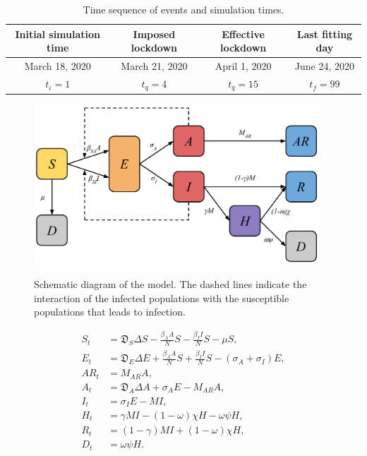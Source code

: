 \documentclass[11pt]{article}
\newcommand{\D}{\mathfrak{D}}
\begin{document}
	\begin{table}[h]
		\centering
		\caption{Time sequence of events and simulation times.}
		\label{tab:times}
		\begin{tabular}{ c c c c }
			\hline
			\hline
			Initial simulation time	&	Imposed lockdown	&	Effective lockdown	&	Last fitting day	\\
			\hline
			March 18, 2020	&	March 21, 2020	&	 April 1, 2020	&	June 24, 2020	\\
			$t_i = 1$	&	$t_q = 4$	&	$t_q = 15$	&	$t_f = 99$ \\
			\hline
			\hline
		\end{tabular}
	\end{table}
	
	\begin{figure}[h!]
		\centering
		\includegraphics[height=6cm]{full-model}
		\label{fig:model}
		\caption{Schematic diagram of the model. The dashed lines indicate the interaction of the infected populations with the susceptible populations that leads to infection.}
	\end{figure}

	\begin{align*}
		S_t &=	\D_S \Delta S - \frac{\beta_{A} A}{N} S - \frac{\beta_{I} I}{N} S - \mu S, \\
		E_t	&=	\D_E \Delta E + \frac{\beta_{A} A}{N} S + \frac{\beta_{I} I}{N} S - (\sigma_A + \sigma_I) E, \\
		AR_t &= M_{AR} A, \\
		A_t	&=	\D_A \Delta A + \sigma_A E - M_{AR} A, \\
		I_t	&=	\sigma_I E - M I, \\
		H_t	&=	\gamma M I - (1 - \omega) \chi H - \omega \psi H, \\
		R_t	&=	(1 - \gamma) M I + (1 - \omega) \chi H, \\
		D_t	&=	\omega \psi H.
	\end{align*}
	
\end{document}
